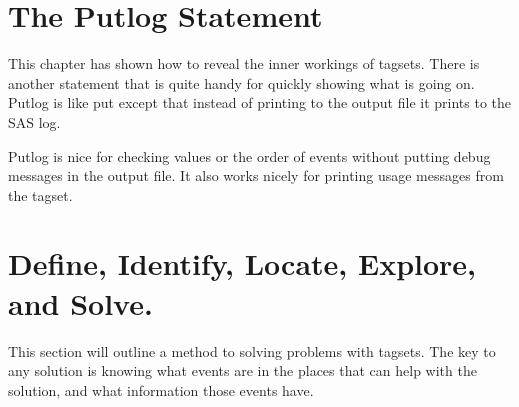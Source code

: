 \section{The Putlog Statement}
This chapter has shown how to reveal the inner workings 
of tagsets.  There
is another statement that is quite handy for quickly showing
what is going on.
Putlog is like put except that instead of
printing to the output file it prints to the SAS log.  

Putlog is nice for checking values or the order of events
without putting debug messages in the output file.  
It also works nicely for printing usage messages from the tagset.

\section{Define, Identify, Locate, Explore, and Solve.}
This section will outline a method to solving problems with tagsets.
The key to any solution is knowing what events are in the places that
can help with the solution, and what information those events have.    

